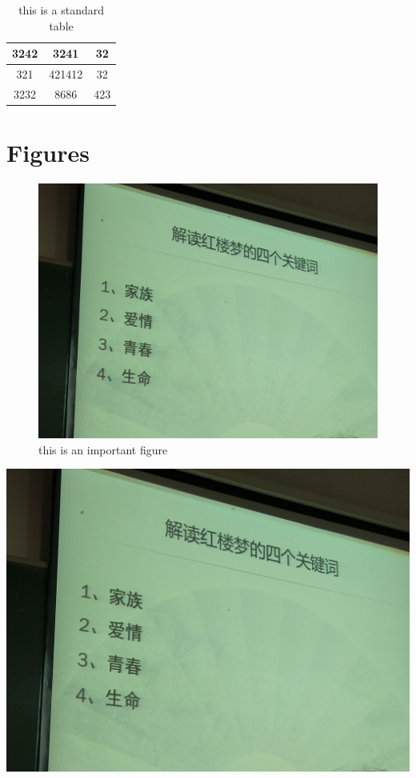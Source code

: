 \documentclass{book}
\begin{document}
\begin{table}[h]
\centering
\begin{tabular}{ccc}
\toprule		%
3242&3241&32\\
\midrule
321&421412&32\\
3232&8686&423\\
\bottomrule
\end{tabular}
\caption{this is a standard table}
\end{table}

\chapter{Figures} %

\begin{figure}[h]
\centering
\includegraphics[scale=0.1]{English_edition.jpg}
\caption{this is an important figure}
\end{figure}

\newpage
\includegraphics[scale=0.1]{English_edition.jpg} 
\end{document}
